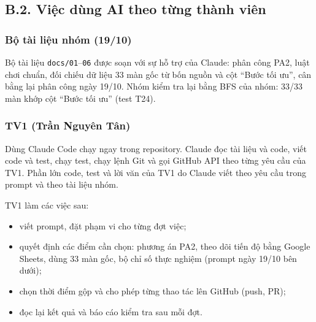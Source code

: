\subsection{B.2. Việc dùng AI theo từng thành viên}

\subsubsection{Bộ tài liệu nhóm (19/10)}

Bộ tài liệu \texttt{docs/\allowbreak{}01}--\texttt{06} được soạn với sự hỗ trợ của Claude: phân công PA2, luật chơi chuẩn, đối chiếu dữ liệu 33 màn gốc từ bốn nguồn và cột ``Bước tối ưu'', cân bằng lại phân công ngày 19/10. Nhóm kiểm tra lại bằng BFS của nhóm: 33/33 màn khớp cột ``Bước tối ưu'' (test T24).

\subsubsection{TV1 (Trần Nguyên Tân)}

Dùng Claude Code chạy ngay trong repository. Claude đọc tài liệu và code, viết code và test, chạy test, chạy lệnh Git và gọi GitHub API theo từng yêu cầu của TV1. Phần lớn code, test và lời văn của TV1 do Claude viết theo yêu cầu trong prompt và theo tài liệu nhóm.

TV1 làm các việc sau:

\begin{itemize}
\tightlist
\item
  viết prompt, đặt phạm vi cho từng đợt việc;
\item
  quyết định các điểm cần chọn: phương án PA2, theo dõi tiến độ bằng Google Sheets, dùng 33 màn gốc, bộ chỉ số thực nghiệm (prompt ngày 19/10 bên dưới);
\item
  chọn thời điểm gộp và cho phép từng thao tác lên GitHub (push, PR);
\item
  đọc lại kết quả và báo cáo kiểm tra sau mỗi đợt.
\end{itemize}


